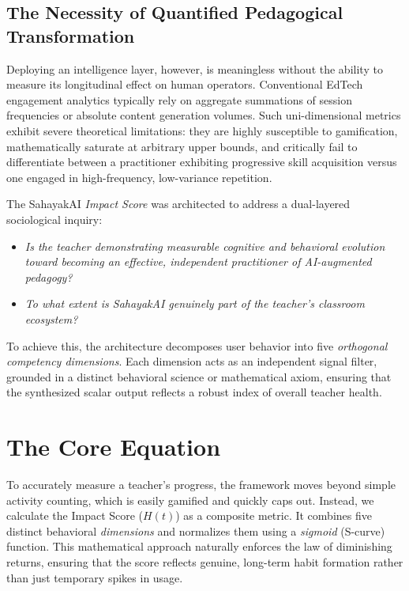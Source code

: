 \documentclass[11pt,a4paper]{article}
\begin{document}
\subsection{The Necessity of Quantified Pedagogical Transformation}
Deploying an intelligence layer, however, is meaningless without the ability to measure its longitudinal effect on human operators. Conventional EdTech engagement analytics typically rely on aggregate summations of session frequencies or absolute content generation volumes. Such uni-dimensional metrics exhibit severe theoretical limitations: they are highly susceptible to gamification, mathematically saturate at arbitrary upper bounds, and critically fail to differentiate between a practitioner exhibiting progressive skill acquisition versus one engaged in high-frequency, low-variance repetition.

The SahayakAI \textit{Impact Score} was architected to address a dual-layered sociological inquiry:
\begin{itemize}
    \item \textit{Is the teacher demonstrating measurable cognitive and behavioral evolution toward becoming an effective, independent practitioner of AI-augmented pedagogy?}
    \item \textit{To what extent is SahayakAI genuinely part of the teacher's classroom ecosystem?}
\end{itemize}

To achieve this, the architecture decomposes user behavior into five \textit{orthogonal competency dimensions}. Each dimension acts as an independent signal filter, grounded in a distinct behavioral science or mathematical axiom, ensuring that the synthesized scalar output reflects a robust index of overall teacher health.

\section{The Core Equation}
To accurately measure a teacher's progress, the framework moves beyond simple activity counting, which is easily gamified and quickly caps out. Instead, we calculate the Impact Score ($H(t)$) as a composite metric. It combines five distinct behavioral \textit{dimensions} and normalizes them using a \textit{sigmoid} (S-curve) function. This mathematical approach naturally enforces the law of diminishing returns, ensuring that the score reflects genuine, long-term habit formation rather than just temporary spikes in usage.
\end{document}
